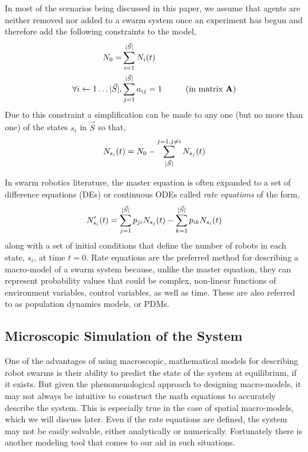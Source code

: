 \documentclass[Main.tex]{subfiles}
\begin{document}
In most of the scenarios being discussed in this paper, we assume that agents are neither removed nor added to a swarm system once an experiment has begun and therefore add the following constraints to the model,
\begin{align}
N_0 = & \sum\limits^{\lvert\vec{S}\rvert}_{i=1} N_i(t)\\
\forall i \gets 1\ldots\lvert\vec{S}\rvert, & \sum\limits^{\lvert\vec{S}\rvert}_{j=1}a_{ij} = 1 \hspace{1cm}\text{(in matrix $\mathbf{A}$)}
\end{align}
Due to this constraint a simplification can be made to any one (but no more than one) of the states $s_i$ in $\vec{S}$ so that,
\begin{equation}
	N_{s_i}(t) = N_0 - \sum\limits^{j=1,j\not=i}_{\lvert\vec{S}\rvert}N_{s_j}(t)
\end{equation}

In swarm robotics literature, the master equation is often expanded to a set of difference equations (DEs) or continuous ODEs called \emph{rate equations} of the form,
\begin{equation}\label{eq:rateeqns}
	N_{s_i}'(t) = \sum\limits_{j=1}^{\lvert\vec{S}\rvert}p_{ji}N_{s_j}(t) - \sum\limits_{k=1}^{\lvert\vec{S}\rvert}p_{ik}N_{s_i}(t)
\end{equation}
along with a set of initial conditions that define the number of robots in each state, $s_i$, at time $t = 0$. Rate equations are the preferred method for describing a macro-model of a swarm system because, unlike the master equation, they can represent probability values that could be complex, non-linear functions of environment variables, control variables, as well as time. These are also referred to as population dynamics models, or PDMs.

\subsection{Microscopic Simulation of the System}
One of the advantages of using macroscopic, mathematical models for describing robot swarms is their ability to predict the state of the system at equilibrium, if it exists. But given the phenomenological approach to designing macro-models, it may not always be intuitive to construct the math equations to accurately describe the system. This is especially true in the case of spatial macro-models, which we will discuss later. Even if the rate equations are defined, the system may not be easily solvable, either analytically or numerically. Fortunately there is another modeling tool that comes to our aid in such situations. 
\end{document}

